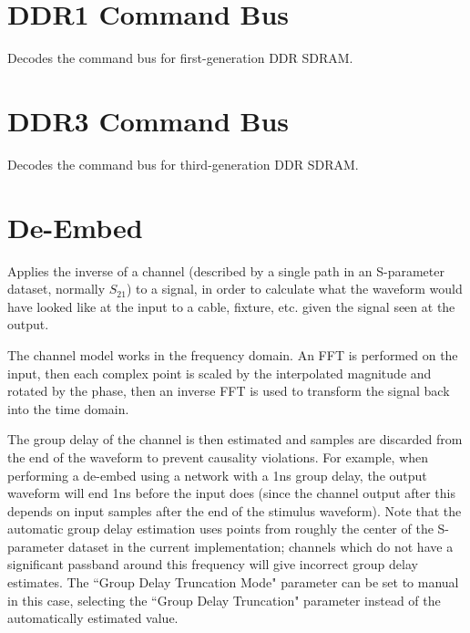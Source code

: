 \pagebreak
\section{DDR1 Command Bus}

Decodes the command bus for first-generation DDR SDRAM.

\pagebreak
\section{DDR3 Command Bus}

Decodes the command bus for third-generation DDR SDRAM.

\pagebreak
\section{De-Embed}
\label{filter:deembed}

Applies the inverse of a channel (described by a single path in an S-parameter dataset, normally $S_{21}$) to a signal,
in order to calculate what the waveform would have looked like at the input to a cable, fixture, etc. given the signal
seen at the output.

The channel model works in the frequency domain. An FFT is performed on the input, then each complex point is scaled by
the interpolated magnitude and rotated by the phase, then an inverse FFT is used to transform the signal back into the
time domain.

The group delay of the channel is then estimated and samples are discarded from the end of the waveform to prevent
causality violations. For example, when performing a de-embed using a network with a 1ns group delay, the output
waveform will end 1ns before the input does (since the channel output after this depends on input samples after the end
of the stimulus waveform). Note that the automatic group delay estimation uses points from roughly the center of the
S-parameter dataset in the current implementation; channels which do not have a significant passband around this
frequency will give incorrect group delay estimates. The ``Group Delay Truncation Mode" parameter can be set to manual
in this case, selecting the ``Group Delay Truncation" parameter instead of the automatically estimated value.

